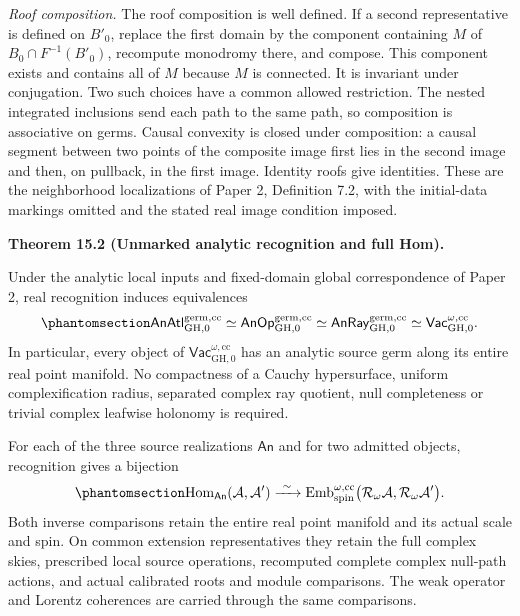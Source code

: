 \documentclass[
  english,
  11pt,
  reqno]{amsart}
\makeatletter
\newcommand{\pandocstatementheading}[1]{%
  \par\if@nobreak\else
    \addpenalty{\@beginparpenalty}%
    \addvspace{.5\baselineskip plus .2\baselineskip minus .2\baselineskip}%
  \fi
  {\normalfont\bfseries #1\par}%
  \nobreak\@afterindenttrue\@afterheading
}
\makeatother
\begin{document}
\emph{Roof composition.} The roof composition is well defined. If a
second representative is defined on \(B'_0\), replace the first domain
by the component containing \(M\) of \(B_0\cap F^{-1}(B'_0)\), recompute
monodromy there, and compose. This component exists and contains all of
\(M\) because \(M\) is connected. It is invariant under conjugation. Two
such choices have a common allowed restriction. The nested integrated
inclusions send each path to the same path, so composition is
associative on germs. Causal convexity is closed under composition: a
causal segment between two points of the composite image first lies in
the second image and then, on pullback, in the first image. Identity
roofs give identities. These are the neighborhood localizations of Paper
2, Definition 7.2, with the initial-data markings omitted and the stated
real image condition imposed.

\pandocstatementheading{\protect{}\label{thm:unmarked-global-analytic-recognition}Theorem 15.2 (Unmarked analytic recognition and full Hom).}

Under the analytic local inputs and fixed-domain global correspondence
of Paper 2, real recognition induces equivalences
\begin{equation}\protect\phantomsection\label{eq:unmarked-global-analytic-recognition}{
\mathsf{AnAtl}^{\mathrm{germ},\mathrm{cc}}_{\mathrm{GH},0}
\simeq
\mathsf{AnOp}^{\mathrm{germ},\mathrm{cc}}_{\mathrm{GH},0}
\simeq
\mathsf{AnRay}^{\mathrm{germ},\mathrm{cc}}_{\mathrm{GH},0}
\simeq
\mathsf{Vac}^{\omega,\mathrm{cc}}_{\mathrm{GH},0}.
}\end{equation} In particular, every object of
\(\mathsf{Vac}^{\omega,\mathrm{cc}}_{\mathrm{GH},0}\) has an analytic
source germ along its entire real point manifold. No compactness of a
Cauchy hypersurface, uniform complexification radius, separated complex
ray quotient, null completeness or trivial complex leafwise holonomy is
required.

For each of the three source realizations \(\mathsf{An}\) and for two
admitted objects, recognition gives a bijection
\begin{equation}\protect\phantomsection\label{eq:unmarked-global-analytic-full-hom}{
\operatorname{Hom}_{\mathsf{An}}(\mathcal A,\mathcal A')
\xrightarrow{\ \sim\ }
\operatorname{Emb}^{\omega,\mathrm{cc}}_{\mathrm{spin}}
\bigl(\mathcal R_\omega\mathcal A,
      \mathcal R_\omega\mathcal A'\bigr).
}\end{equation} Both inverse comparisons retain the entire real point
manifold and its actual scale and spin. On common extension
representatives they retain the full complex skies, prescribed local
source operations, recomputed complete complex null-path actions, and
actual calibrated roots and module comparisons. The weak operator and
Lorentz coherences are carried through the same comparisons.
\end{document}
